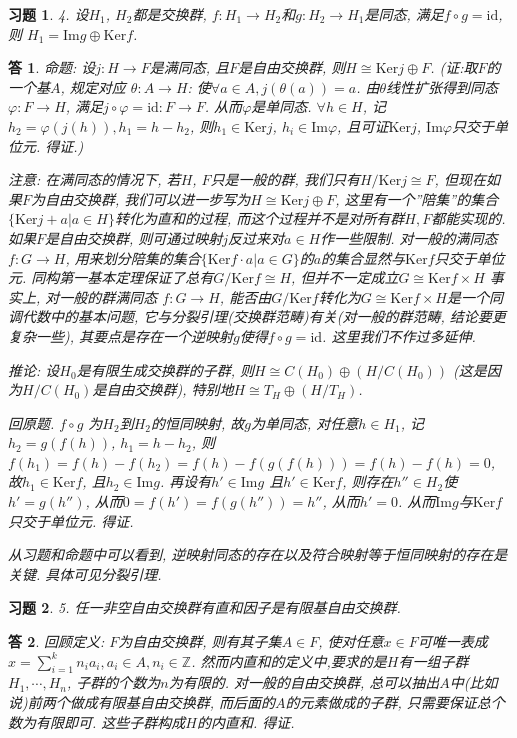 \documentclass{ctexart}%
\newtheorem*{exercise}{习题}
\newtheorem*{solution}{答}
\theoremstyle{definition}
\theoremstyle{remark}
\begin{document}
\begin{exercise}4. 设$H_1$, $H_2$都是交换群, $f:H_1\rightarrow H_2$和$g:H_2\rightarrow H_1$是同态, 满足$f\circ g = \text{id}$, 则 $H_1 = \text{Im} g\oplus \text{Ker} f$. 
\end{exercise}
\begin{solution}
命题: 设$j: H\rightarrow F$是满同态, 且$F$是自由交换群, 则$H\cong \text{Ker}j \oplus F$. (证:取$F$的一个基$A$, 规定对应 $\theta: A\rightarrow H$: 使$\forall a\in A, j(\theta(a))=a$. 由$\theta$线性扩张得到同态$\varphi: F\rightarrow H$, 满足$j\circ \varphi = \text{id}: F\rightarrow F$. 从而$\varphi$是单同态. $\forall h\in H$, 记$h_2 = \varphi(j(h)),h_1=h-h_2$, 则$h_1\in \text{Ker} j$, $h_i\in \text{Im} \varphi$, 且可证$\text{Ker} j$, $\text{Im}\varphi$只交于单位元. 得证.)

注意: 在满同态的情况下, 若$H$, $F$只是一般的群, 我们只有$H/\text{Ker}j\cong F$, 但现在如果$F$为自由交换群, 我们可以进一步写为$H\cong \text{Ker}j\oplus F$, 这里有一个''陪集''的集合$\{\text{Ker}j+a|a\in H\}$转化为直和的过程, 而这个过程并不是对所有群$H,F$都能实现的. 如果$F$是自由交换群, 则可通过映射$j$反过来对$a\in H$作一些限制. 对一般的满同态$f: G\rightarrow H$, 用来划分陪集的集合$\{\text{Ker}f\cdot a|a\in G\}$的$a$的集合显然与$\text{Ker} f$只交于单位元. 同构第一基本定理保证了总有$G/\text{Ker} f \cong H$, 但并不一定成立$G \cong \text{Ker} f \times H$   事实上, 对一般的群满同态 $f:G\rightarrow H$, 能否由$G/\text{Ker}f$转化为$G\cong \text{Ker}f\times H$是一个同调代数中的基本问题, 它与分裂引理(交换群范畴)有关(对一般的群范畴, 结论要更复杂一些), 其要点是存在一个逆映射$g$使得$f\circ g= \text{id}$.  这里我们不作过多延伸. 

推论: 设$H_0$是有限生成交换群的子群, 则$H\cong C(H_0)\oplus (H/C(H_0))$ (这是因为$H/C(H_0)$是自由交换群), 特别地$H\cong T_H\oplus (H/T_H)$.

回原题. $f\circ g$ 为$H_2$到$H_2$的恒同映射, 故$g$为单同态, 对任意$h\in H_1$, 记$h_2=g(f(h))$, $h_1=h-h_2$, 则$f(h_1)=f(h)-f(h_2)=f(h)-f(g(f(h)))=f(h)-f(h)=0$, 故$h_1\in \text{Ker} f$, 且$h_2\in \text{Im}g$. 再设有$h'\in \text{Im}g$ 且$h'\in \text{Ker}f$, 则存在$h''\in H_2$使$h'=g(h'')$, 从而$0=f(h')=f(g(h''))=h''$, 从而$h'=0$. 从而$\text{Im} g$与$\text{Ker} f$只交于单位元. 得证. 

从习题和命题中可以看到, 逆映射同态的存在以及符合映射等于恒同映射的存在是关键. 具体可见分裂引理. 
\end{solution}

\begin{exercise}
5. 任一非空自由交换群有直和因子是有限基自由交换群.
\end{exercise}
\begin{solution}
回顾定义: $F$为自由交换群, 则有其子集$A\in F$, 使对任意$x\in F$可唯一表成$x=\sum_{i=1}^k n_ia_i,a_i\in A,n_i\in \mathbb{Z}$. 然而内直和的定义中,要求的是$H$有一组子群$H_1,\cdots, H_n$, 子群的个数为$n$为有限的. 对一般的自由交换群, 总可以抽出$A$中(比如说)前两个做成有限基自由交换群, 而后面的$A$的元素做成的子群, 只需要保证总个数为有限即可. 这些子群构成$H$的内直和. 得证.
\end{solution}
\end{document}

